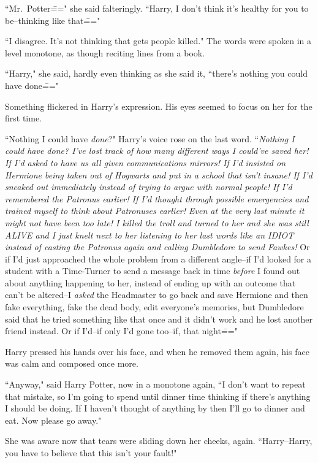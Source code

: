 ``Mr.~Potter\===" she said falteringly. ``Harry, I don't think it's healthy for you to be\---thinking like that\==="

``I disagree. It's not thinking that gets people killed." The words were spoken in a level monotone, as though reciting lines from a book.

``Harry," she said, hardly even thinking as she said it, ``there's nothing you could have done\==="

Something flickered in Harry's expression. His eyes seemed to focus on her for the first time.

``Nothing I could have \emph{done}?" Harry's voice rose on the last word. ``\emph{Nothing I could have \emph{done}? I've lost track of how many different ways I could've saved her! If I'd asked to have us all given communications mirrors! If I'd insisted on Hermione being taken out of Hogwarts and put in a school that isn't insane! If I'd sneaked out immediately instead of trying to argue with normal people! If I'd remembered the Patronus earlier! If I'd thought through possible emergencies and trained myself to think about Patronuses earlier! Even at the very last minute it might not have been too late! I killed the troll and turned to her and she was still ALIVE and I just knelt next to her listening to her last words like an IDIOT instead of casting the Patronus again and calling Dumbledore to send Fawkes!} Or if I'd just approached the whole problem from a different angle\---if I'd looked for a student with a Time-Turner to send a message back in time \emph{before} I found out about anything happening to her, instead of ending up with an outcome that can't be altered\---I \emph{asked} the Headmaster to go back and save Hermione and then fake everything, fake the dead body, edit everyone's memories, but Dumbledore said that he tried something like that once and it didn't work and he lost another friend instead. Or if I'd\---if only I'd gone too\---if, that night\==="

Harry pressed his hands over his face, and when he removed them again, his face was calm and composed once more.

``Anyway," said Harry Potter, now in a monotone again, ``I don't want to repeat that mistake, so I'm going to spend until dinner time thinking if there's anything I should be doing. If I haven't thought of anything by then I'll go to dinner and eat. Now please go away."

She was aware now that tears were sliding down her cheeks, again. ``Harry\---Harry, you have to believe that this isn't your fault!"

